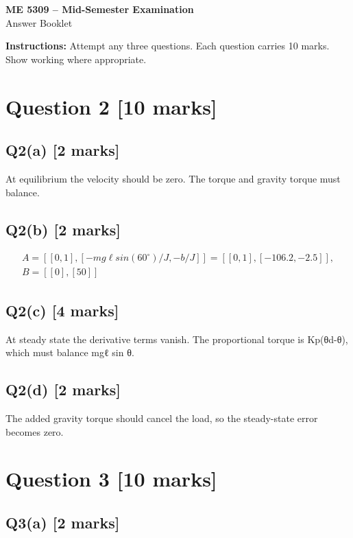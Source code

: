 \documentclass[11pt,a4paper]{article}
\begin{document}
\begin{center}
{\Large\bfseries ME 5309 -- Mid-Semester Examination}\\[3pt]
{\large Answer Booklet}\\[8pt]
\end{center}
\textbf{Instructions:} Attempt any three questions. Each question carries 10 marks. Show working where appropriate.
\section*{Question 2 \hfill [10 marks]}
\subsection*{Q2(a) \hfill [2 marks]}

At equilibrium the velocity should be zero.
The torque and gravity torque must balance.

\subsection*{Q2(b) \hfill [2 marks]}

\[\begin{aligned}A = [[0,1], [-mg\ell sin(60^{\circ})/J, -b/J]] = [[0,1], [-106.2, -2.5]],\\ B = [[0],[50]]\end{aligned}\]

\subsection*{Q2(c) \hfill [4 marks]}

At steady state the derivative terms vanish.
The proportional torque is Kp(θd-θ), which must balance mgℓ sin θ.

\subsection*{Q2(d) \hfill [2 marks]}

The added gravity torque should cancel the load, so the steady-state error becomes zero. 
\section*{Question 3 \hfill [10 marks]}
\subsection*{Q3(a) \hfill [2 marks]}
\end{document}
